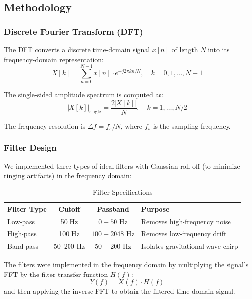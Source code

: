 \documentclass[12pt,a4paper]{article}
\begin{document}
\subsection{Methodology}

\subsubsection{Discrete Fourier Transform (DFT)}

The DFT converts a discrete time-domain signal $x[n]$ of length $N$ into its frequency-domain representation:
\begin{equation}
    X[k] = \sum_{n=0}^{N-1} x[n] \cdot e^{-j2\pi kn/N}, \quad k = 0, 1, \ldots, N-1
\end{equation}

The single-sided amplitude spectrum is computed as:
\begin{equation}
    |X[k]|_{\text{single}} = \frac{2|X[k]|}{N}, \quad k = 1, \ldots, N/2
\end{equation}

The frequency resolution is $\Delta f = f_s / N$, where $f_s$ is the sampling frequency.

\subsubsection{Filter Design}

We implemented three types of ideal filters with Gaussian roll-off (to minimize ringing artifacts) in the frequency domain:

\begin{table}[H]
\centering
\caption{Filter Specifications}
\label{tab:filters}
\begin{tabular}{@{}lccp{6cm}@{}}
\toprule
\textbf{Filter Type} & \textbf{Cutoff} & \textbf{Passband} & \textbf{Purpose} \\
\midrule
Low-pass & 50 Hz & $0 - 50$ Hz & Removes high-frequency noise \\
High-pass & 100 Hz & $100 - 2048$ Hz & Removes low-frequency drift \\
Band-pass & 50--200 Hz & $50 - 200$ Hz & Isolates gravitational wave chirp \\
\bottomrule
\end{tabular}
\end{table}

The filters were implemented in the frequency domain by multiplying the signal's FFT by the filter transfer function $H(f)$:
\begin{equation}
    Y(f) = X(f) \cdot H(f)
\end{equation}
and then applying the inverse FFT to obtain the filtered time-domain signal.
\end{document}
